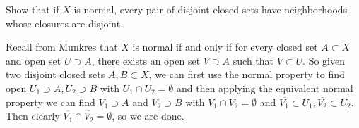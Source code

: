 \documentclass[11pt,letterpaper]{article}
\begin{document}
\begin{problem}
    Show that if $X$ is normal, every pair of disjoint closed sets have neighborhoods whose closures are disjoint.
\end{problem}

\begin{solution}
    Recall from Munkres that $X$ is normal if and only if for every closed set $A\subset X$ and open set $U\supset A$, there exists an open set $V\supset A$ such that $\overline{V}\subset U$. So given two disjoint closed sets $A,B\subset X$, we can first use the normal property to find open $U_1\supset A, U_2\supset B$ with $U_1\cap U_2=\emptyset$ and then applying the equivalent normal property we can find $V_1\supset A$ and $V_2\supset B$ with $V_1\cap V_2=\emptyset$ and $\overline{V_1}\subset U_1, \overline{V_2}\subset U_2$. Then clearly $\overline{V_1}\cap \overline{V_2}=\emptyset$, so we are done.
\end{solution}
\end{document}
